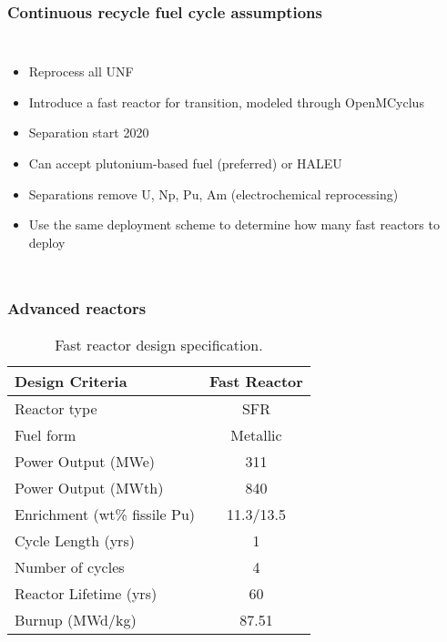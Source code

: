 \begin{frame}
    \frametitle{Continuous recycle fuel cycle assumptions}
    \begin{columns}
        
    \column[t]{6cm}
    \vspace{-0.5cm}
    

        \column[t]{4.5cm}
        \begin{itemize}
            \item Reprocess all \gls{UNF} 
            \item Introduce a fast reactor for transition, modeled through 
                  OpenMCyclus
            \item Separation start 2020
            \item Can accept plutonium-based fuel (preferred) or \gls{HALEU}
            \item Separations remove U, Np, Pu, Am (electrochemical reprocessing)
            \item<2-> Use the same deployment scheme to determine how many fast 
                  reactors to deploy
        \end{itemize}

\end{columns}
\end{frame}

\begin{frame}
    \frametitle{Advanced reactors}
    \vspace{-0.7cm}
    \begingroup
        \renewcommand{\arraystretch}{1.2}
        \begin{table}
            \centering
            \begin{threeparttable}
        
            \caption{Fast reactor design specification.}
            \label{tab:fast_rx}
            \begin{tabular}{l c}
                \hline
                Design Criteria & Fast Reactor \cite{fichtlscherer_assessing_2019,triplett_prism:_2012}\\
                \hline
                Reactor type & \acrfull{SFR} \\
                Fuel form &  Metallic \\
                Power Output (MWe) & 311 \\
                Power Output (MWth) & 840 \\
                Enrichment (wt\% fissile Pu) &  11.3/13.5\\
                Cycle Length (yrs) & 1 \\
                Number of cycles &  4 \\
                Reactor Lifetime (yrs)&  60\\
                Burnup (MWd/kg) & 87.51 \\
                \hline
            \end{tabular}
        \end{threeparttable}
        \end{table} 
    \endgroup
\end{frame}
